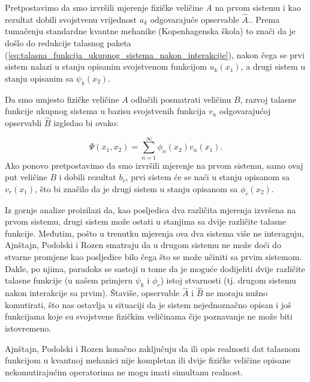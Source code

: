 Pretpostavimo da smo izvršili mjerenje fizičke veličine {\it{A}} na prvom sistemu i kao rezultat dobili svojstvenu vrijednost $a_k$ odgovarajuće opservable $\hat{A}$..
Prema tumačenju standardne kvantne mehanike (Kopenhagenska škola) to znači da je došlo do redukcije talasnog paketa (\ref{eq:talasna_funkcija_ukupnog_sistema_nakon_interakcije}), nakon čega se prvi sistem nalazi u stanju opisanim svojstvenom funkcijom $u_k(x_1)$, a drugi sistem u stanju opisanim sa $\psi_k(x_2)$.

Da smo umjesto fizičke veličine $A$ odlučili posmatrati veličinu $B$, razvoj talasne funkcije ukupnog sistema u bazisu svojstvenih funkcija $v_n$ odgovarajućoj opservabli $\hat{B}$ izgledao bi ovako:

\begin{equation}
    \Psi(x_1, x_2) = \sum_{n=1}^{\infty} \phi_n(x_2)v_n(x_1).
\end{equation}
Ako ponovo pretpostavimo da smo izvršili mjerenje na prvom sistemu, samo ovaj put veličine $B$ i dobili rezultat $b_r$, prvi sistem će se naći u stanju opisanom sa $v_r(x_1)$, što bi značilo da je drugi sistem u stanju opisanom sa $\phi_r(x_2)$.

Iz gornje analize proizilazi da, kao posljedica dva različita mjerenja izvršena na prvom sistemu,
drugi sistem može ostati u stanjima sa dvije različite talasne funkcije.
Međutim, pošto u trenutku mjerenja ova dva sistema više ne interaguju, Ajnštajn, Podolski i Rozen smatraju da u drugom sistemu ne može doći do stvarne promjene kao posljedice
bilo čega što se može učiniti sa prvim sistemom.
Dakle, po njima, paradoks se sastoji u tome da je moguće dodijeliti dvije različite talasne funkcije (u našem primjeru $\psi_k$ i $\phi_r$) istoj stvarnosti (tj. drugom sistemu nakon interakcije sa prvim).
Štaviše, opservable $\hat{A}$ i $\hat{B}$ ne moraju nužno komutirati, što nas ostavlja u situaciji da je sistem nejednoznačno opisan i još funkcijama koje su svojstvene fizičkim veličinama čije poznavanje ne može biti istovremeno.


Ajnštajn, Podolski i Rozen konačno zaključuju da ili opis realnosti dat talasnom funkcijom u kvantnoj mehanici nije kompletan
ili dvije fizičke veličine opisane nekomutirajućim operatorima ne mogu imati simultanu realnost.

